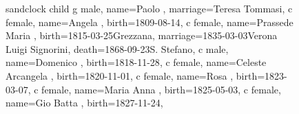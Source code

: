 \documentclass{article}
\begin{document}
\begin{figure}
\begin{minipage}[b]{0.39\textwidth}
    \begin{genealogypicture}[
        processing=database,
        database format=full,
        node size=3.5cm,
        level size=2.8cm,
        level distance=6mm,
        list separators hang=3mm,
        name font=\bfseries,
        surn code={\textcolor{black!50!black}{#1}},
        place text={\newline}{},
        date format=d month yyyy,
        tcbset={male/.style={colframe=blue,colback=blue!5},
        female/.style={colframe=red,colback=red!5}},
        box={fit basedim=7pt,boxsep=2pt,segmentation style=solid,
            halign=left,before upper=\parskip1pt,
            \gtrDBsex,
        },
    ]
    sandclock
    {
        child{
            g{
                male,
                name={Paolo },
                marriage={Teresa Tommasi}{},
            }
            c{
                female,
                name={Angela },
                birth={1809-08-14}{},
            }
            c{
                female,
                name={Prassede Maria },
                birth={1815-03-25}{Grezzana},
                marriage={1835-03-03}{Verona \newline Luigi Signorini},
                death={1868-09-23}{S. Stefano},
            }
            c{
                male,
                name={Domenico },
                birth={1818-11-28}{},
            }
            c{
                female,
                name={Celeste Arcangela },
                birth={1820-11-01}{},
            }
            c{
                female,
                name={Rosa },
                birth={1823-03-07}{},
            }
            c{
                female,
                name={Maria Anna },
                birth={1825-05-03}{},
            }
            c{
                female,
                name={Gio Batta },
                birth={1827-11-24}{},
            }
        }
    }
    \end{genealogypicture}

\end{minipage}
\hfill
\begin{minipage}[b]{0.39\textwidth}
\centering


\end{minipage}
\end{figure}
\end{document}
